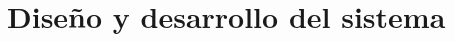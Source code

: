 \documentclass[../main.tex]{subfiles}
\begin{document}
\chapter{Diseño y desarrollo del sistema}
\label{chap:arquitectura}
\end{document}
